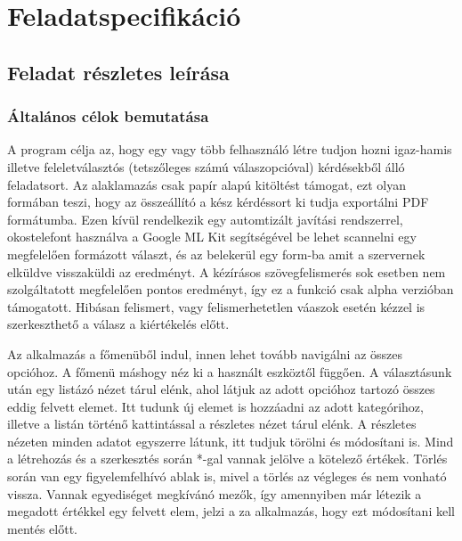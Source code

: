 \chapter{Feladatspecifikáció}
\label{sec:Sepcification}

\section{Feladat részletes leírása}
\label{sec:SepcificationDescription}


\subsection{Általános célok bemutatása}


A program célja az, hogy egy vagy több felhasználó létre tudjon hozni igaz-hamis illetve feleletválasztós (tetszőleges számú válaszopcióval) kérdésekből álló feladatsort.
Az alaklamazás csak papír alapú kitöltést támogat, ezt olyan formában teszi, hogy az összeállító a kész kérdéssort ki tudja exportálni PDF formátumba.
Ezen kívül rendelkezik egy automtizált javítási rendszerrel, okostelefont használva a Google ML Kit\cite{MlLKit} segítségével be lehet scannelni egy megfelelően formázott választ, és az belekerül egy form-ba amit a szervernek elküldve visszaküldi az eredményt.
A kézírásos szövegfelismerés sok esetben nem szolgáltatott megfelelően pontos eredményt, így ez a funkció csak alpha verzióban támogatott.
Hibásan felismert, vagy felismerhetetlen váaszok esetén kézzel is szerkeszthető a válasz a kiértékelés előtt.

Az alkalmazás a főmenüből indul, innen lehet tovább navigálni az összes opcióhoz.
A főmenü máshogy néz ki a használt eszköztől függően.
A választásunk után egy listázó nézet tárul elénk, ahol látjuk az adott opcióhoz tartozó összes eddig felvett elemet.
Itt tudunk új elemet is hozzáadni az adott kategórihoz, illetve a listán történő kattintással a részletes nézet tárul elénk.
A részletes nézeten minden adatot egyszerre látunk, itt tudjuk törölni és módosítani is.
Mind a létrehozás és a szerkesztés során *-gal vannak jelölve a kötelező értékek. Törlés során van egy figyelemfelhívó ablak is, mivel a törlés az végleges és nem vonható vissza.
Vannak egyediséget megkívánó mezők, így amennyiben már létezik a megadott értékkel egy felvett elem, jelzi a za alkalmazás, hogy ezt módosítani kell mentés előtt.

